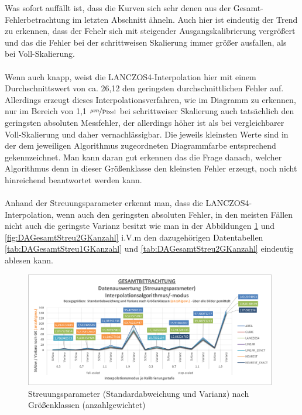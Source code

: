 \documentclass[
fontsize=10pt, 
listof = totoc,
parskip = half	
]{report}
\begin{document}
\noindent Was sofort auffällt ist, dass die Kurven sich sehr denen aus der Gesamt-Fehlerbetrachtung im letzten Abschnitt ähneln. Auch hier ist eindeutig der Trend zu erkennen, dass der Fehelr sich mit steigender Ausgangskalibrierung vergrößert und das die Fehler bei der schrittweisen Skalierung immer größer ausfallen, als bei Voll-Skalierung. 
\\\\
Wenn auch knapp, weist die LANCZOS4-Interpolation hier mit einem Durchschnittswert von ca. 26,12 den geringsten durchschnittlichen Fehler auf. Allerdings erzeugt dieses Interpolationsverfahren, wie im Diagramm zu erkennen, nur im Bereich von 1,1 $\nicefrac{\mu m}{\text{Pixel}}$ bei schrittweiser Skalierung auch tatsächlich den geringsten absoluten Messfehler, der allerdings höher ist als bei vergleichbarer Voll-Skalierung und daher vernachlässigbar. Die jeweils kleinsten Werte sind in der dem jeweiligen Algorithmus zugeordneten Diagrammfarbe entsprechend gekennzeichnet. Man kann daran gut erkennen das die Frage danach, welcher Algorithmus denn in dieser Größenklasse den kleinsten Fehler erzeugt, noch nicht hinreichend beantwortet werden kann.
\\\\
Anhand der Streuungsparameter erkennt man, dass die LANCZOS4-Interpolation, wenn auch den geringsten absoluten Fehler, in den meisten Fällen nicht auch die geringste Varianz besitzt wie man in der Abbildungen \ref{fig:DAGesamtStreu1GKanzahl} und \ref{fig:DAGesamtStreu2GKanzahl} i.V.m  den dazugehörigen Datentabellen \ref{tab:DAGesamtStreu1GKanzahl} und \ref{tab:DAGesamtStreu2GKanzahl} eindeutig ablesen kann.

\begin{figure}[H]
	\centering
	\includegraphics[width=11cm, height=\textheight, keepaspectratio]{pics/DA_Gesamt_Streu1_GKanzahl}
	\caption{Streuungsparameter (Standardabweichung und Varianz) nach Größenklassen (anzahlgewichtet)}
	\label{fig:DAGesamtStreu1GKanzahl}
\end{figure}
\end{document}
